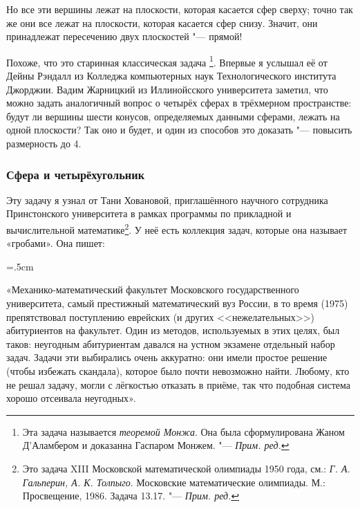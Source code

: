 \documentclass[twoside]{book}
\makeatletter
\newcommand{\rindex}[2][\imki@jobname]{%
\index[#1]{\detokenize{#2}}%
}
\newcommand\MMO{\emph{Г. А. Гальперин, А. К. Толпыго}. Московские математические олимпиады. М.: Просвещение, 1986}
\makeatother
\begin{document}
Но все эти вершины лежат на плоскости, которая касается сфер сверху;
точно так же они все лежат на плоскости, которая касается сфер снизу.
Значит, они принадлежат пересечению двух плоскостей "--- прямой! \heart

\medskip
Похоже, что это старинная классическая задача%
\footnote{Эта задача называется \emph{теоремой Монжа}.
Она была сформулирована Жаном Д’Аламбером и доказанна Гаспаром Монжем. "---
\emph{Прим. ред.}}.
Впервые я услышал её от Дейны Рэндалл %
из Колледжа компьютерных наук Технологического института Джорджии.
Вадим Жарницкий из Иллинойсского университета заметил, что можно задать аналогичный вопрос о четырёх сферах в трёхмерном пространстве: будут ли вершины шести конусов, определяемых данными сферами, лежать на одной плоскости?
Так оно и будет, и один из способов это доказать "--- повысить размерность до 4.







\subsubsection*{Сфера и четырёхугольник}%

Эту задачу я узнал от Тани Ховановой, приглашённого научного
сотрудника Принстонского университета в рамках программы по прикладной
и вычислительной математике\footnote{Это задача XIII Московской математической олимпиады 1950 года, см.: \MMO. Задача 13.17. "---
\emph{Прим. ред.}}.
У неё есть коллекция задач, которые она
называет «гробами».
Она пишет:

\medskip

\begin{trivlist}\leftskip=5mm\rightskip=.5cm
\small
\item\relax«Механико-математический факультет Московского государственного университета, самый престижный математический вуз России, в то время (1975) препятствовал поступлению еврейских (и других <<нежелательных>>) абитуриентов на факультет.
Один из методов, используемых в этих целях, был таков: неугодным абитуриентам давался на устном экзамене отдельный набор задач.
Задачи эти выбирались очень аккуратно: они имели простое решение
(чтобы избежать скандала), которое было почти невозможно найти.
Любому, кто не решал задачу, могли с лёгкостью отказать в приёме, так
что подобная система хорошо отсеивала неугодных». 
\end{trivlist}
\end{document}
